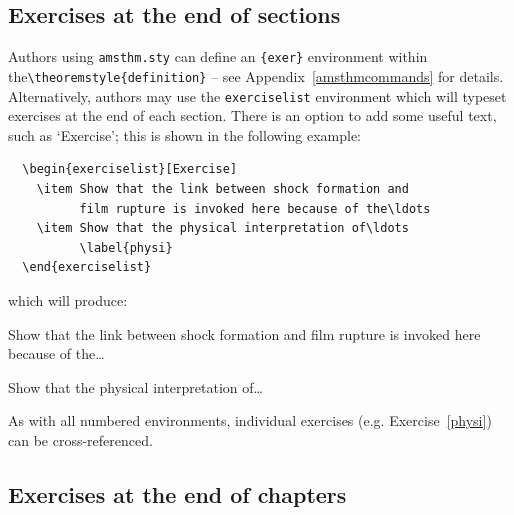 \subsection{Exercises at the end of sections}
\label{exendofsections}

Authors using \verb"amsthm.sty" can define an \verb"{exer}" environment within the\linebreak \verb"\theoremstyle{definition}" -- see Appendix~\ref{amsthmcommands} for details. Alternatively, authors may use the \verb"exerciselist" environment which will typeset exercises at the end of each section. There is an option to add some useful text, such as `Exercise'; this is shown in the following example:
\begin{verbatim}
  \begin{exerciselist}[Exercise]
    \item Show that the link between shock formation and
          film rupture is invoked here because of the\ldots
    \item Show that the physical interpretation of\ldots
          \label{physi}
  \end{exerciselist}
\end{verbatim}
which will produce:
  \begin{exerciselist}[Exercise]
    \item Show that the link between shock formation and
          film rupture is invoked here because of the\ldots
    \item Show that the physical interpretation of\ldots
          \label{physi}
  \end{exerciselist}
As with all numbered environments, individual exercises (e.g. Exercise~\ref{physi}) can be cross-referenced.


\subsection{Exercises at the end of chapters}

